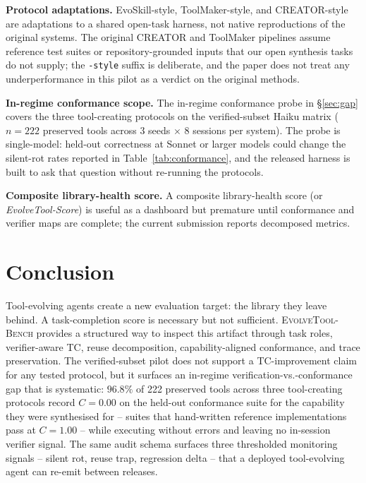\documentclass[sigconf,anonymous,review,natbib=false]{acmart}
\begin{document}
\textbf{Protocol adaptations.} EvoSkill-style, ToolMaker-style, and CREATOR-style are adaptations to a shared open-task harness, not native reproductions of the original systems. The original CREATOR and ToolMaker pipelines assume reference test suites or repository-grounded inputs that our open synthesis tasks do not supply; the \texttt{-style} suffix is deliberate, and the paper does not treat any underperformance in this pilot as a verdict on the original methods.

\textbf{In-regime conformance scope.} The in-regime conformance probe in \S\ref{sec:gap} covers the three tool-creating protocols on the verified-subset Haiku matrix ($n{=}222$ preserved tools across 3 seeds $\times$ 8 sessions per system). The probe is single-model: held-out correctness at Sonnet or larger models could change the silent-rot rates reported in Table~\ref{tab:conformance}, and the released harness is built to ask that question without re-running the protocols.

\textbf{Composite library-health score.} A composite library-health score (or \emph{EvolveTool-Score}) is useful as a dashboard but premature until conformance and verifier maps are complete; the current submission reports decomposed metrics.

\section{Conclusion}

Tool-evolving agents create a new evaluation target: the library they leave behind. A task-completion score is necessary but not sufficient. \textsc{EvolveTool-Bench} provides a structured way to inspect this artifact through task roles, verifier-aware TC, reuse decomposition, capability-aligned conformance, and trace preservation. The verified-subset pilot does not support a TC-improvement claim for any tested protocol, but it surfaces an in-regime verification-vs.-conformance gap that is systematic: $96.8\%$ of 222 preserved tools across three tool-creating protocols record $C{=}0.00$ on the held-out conformance suite for the capability they were synthesised for -- suites that hand-written reference implementations pass at $C{=}1.00$ -- while executing without errors and leaving no in-session verifier signal. The same audit schema surfaces three thresholded monitoring signals -- silent rot, reuse trap, regression delta -- that a deployed tool-evolving agent can re-emit between releases.
\end{document}
